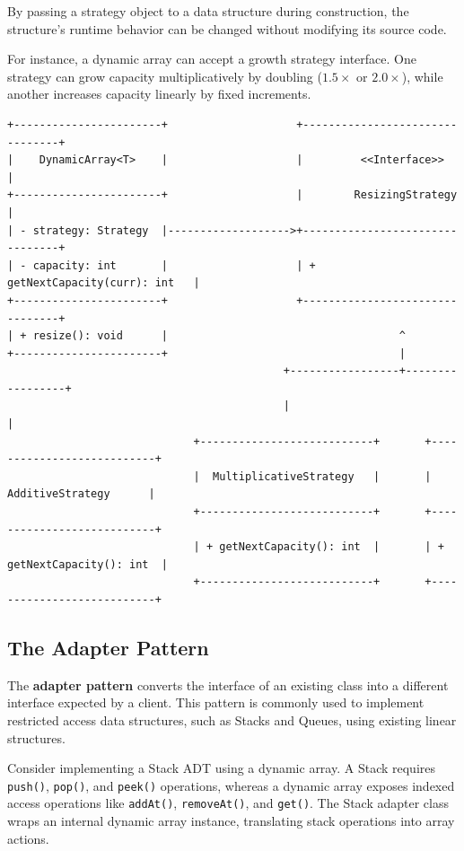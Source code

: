 \documentclass[12pt]{report}
\begin{document}
By passing a strategy object to a data structure during construction, the structure's runtime behavior can be changed without modifying its source code.

For instance, a dynamic array can accept a growth strategy interface. One strategy can grow capacity multiplicatively by doubling ($1.5\times$ or $2.0\times$), while another increases capacity linearly by fixed increments.

\begin{verbatim}
+-----------------------+                    +--------------------------------+
|    DynamicArray<T>    |                    |         <<Interface>>          |
+-----------------------+                    |        ResizingStrategy        |
| - strategy: Strategy  |------------------->+--------------------------------+
| - capacity: int       |                    | + getNextCapacity(curr): int   |
+-----------------------+                    +--------------------------------+
| + resize(): void      |                                    ^
+-----------------------+                                    |
                                           +-----------------+-----------------+
                                           |                                   |
                             +---------------------------+       +---------------------------+
                             |  MultiplicativeStrategy   |       |     AdditiveStrategy      |
                             +---------------------------+       +---------------------------+
                             | + getNextCapacity(): int  |       | + getNextCapacity(): int  |
                             +---------------------------+       +---------------------------+
\end{verbatim}

\subsection{The Adapter Pattern}

The \textbf{adapter pattern} converts the interface of an existing class into a different interface expected by a client. This pattern is commonly used to implement restricted access data structures, such as Stacks and Queues, using existing linear structures.

Consider implementing a Stack ADT using a dynamic array. A Stack requires \texttt{push()}, \texttt{pop()}, and \texttt{peek()} operations, whereas a dynamic array exposes indexed access operations like \texttt{addAt()}, \texttt{removeAt()}, and \texttt{get()}. The Stack adapter class wraps an internal dynamic array instance, translating stack operations into array actions.
\end{document}
